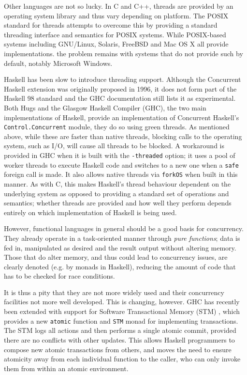 Other languages are not so lucky.  In C and C++, threads are provided
by an operating system library and thus vary depending on platform.
The POSIX standard for threads attempts to overcome this by providing
a standard threading interface and semantics for POSIX systems.  While
POSIX-based systems including GNU/Linux, Solaris, FreeBSD and Mac OS X
all provide implementations. the problem remains with systems that do
not provide such by default, notably Microsoft Windows.

Haskell has been slow to introduce threading support.  Although the
Concurrent Haskell\cite{conchaskell} extension was originally proposed
in 1996, it does not form part of the Haskell 98 standard and the GHC
documentation still lists it as experimental.  Both Hugs and the
Glasgow Haskell Compiler (GHC), the two main implementations of
Haskell, provide an implementation of Concurrent Haskell's
\texttt{Control.Concurrent} module, they do so using green threads.
As mentioned above, while these are faster than native threads,
blocking calls to the operating system, such as I/O, will cause all
threads to be blocked.  A workaround is provided in GHC when it is
built with the \texttt{-threaded} option; it uses a pool of worker
threads to execute Haskell code and switches to a new one when a
\texttt{safe} foreign call is made.  It also allows native threads via
\texttt{forkOS} when built in this manner.  As with C, this makes
Haskell's thread behaviour dependent on the underlying system as
opposed to providing a standard set of operations and semantics;
whether threads are provided and how well they perform depends
entirely on which implementation of Haskell is being used.

However, functional languages in general should be a good basis for
concurrency.  They already operate in a task-oriented manner through
\emph{pure functions}; data is fed in, manipulated as desired and the
result output without altering memory.  Those that do alter memory,
and thus could lead to concurrency issues, are clearly denoted
(e.g. by monads in Haskell), reducing the amount of code that has to
be checked for race conditions.

It is thus a pity that they are not more widely used and their
concurrency facilities not more well developed.  This is changing,
however.  GHC has recently been extended with support for Software
Transactional Memory (STM) \cite{haskellstm}, which provides a new
\texttt{atomic} function and \texttt{STM} monad for implementing
transactions.  The STM logs all actions and then performs a single
atomic commit, provided there are no conflicts with other updates.
This allows Haskell programmers to compose new atomic transactions
from others, and moves the need to ensure atomicity away from each
individual function to the caller, who can only invoke them from
within an atomic environment.

